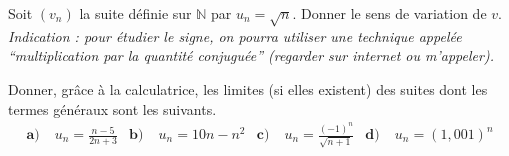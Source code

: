 \documentclass[11pt]{article}
\begin{document}
\begin{exo}[$\star$]
  Soit $(v_n)$ la suite définie sur $\mathbb{N}$ par $u_n=\sqrt{n}$. Donner
  le sens de variation de $v$. \emph{Indication : pour étudier le signe, on
  pourra utiliser une technique appelée ``multiplication par la quantité
  conjuguée'' (regarder sur internet ou m'appeler).}
\end{exo}

\begin{exo}
 Donner, gr\^ace à la calculatrice, les limites (si elles existent) des suites
 dont les termes généraux sont les suivants. 
 \begin{align*}
   \textbf{a)}\;& u_n = \frac{n - 5}{2n+3} &
   \textbf{b)}\;& u_n = 10n - n^2 &
   \textbf{c)}\;& u_n = \frac{(-1)^n}{\sqrt{n+1}} &
   \textbf{d)}\;& u_n = (1,001)^n
 \end{align*}
\end{exo}
\end{document}
